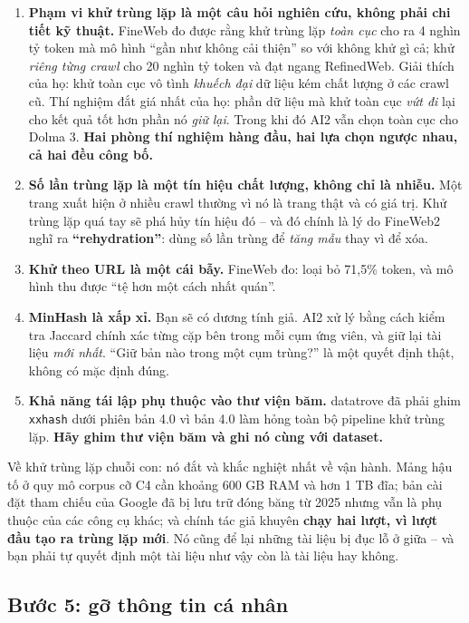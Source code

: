 \begin{enumerate}
	\item \textbf{Phạm vi khử trùng lặp là một câu hỏi nghiên cứu, không phải chi tiết kỹ thuật.} FineWeb đo được rằng khử trùng lặp \emph{toàn cục} cho ra 4 nghìn tỷ token mà mô hình “gần như không cải thiện” so với không khử gì cả; khử \emph{riêng từng crawl} cho 20 nghìn tỷ token và đạt ngang RefinedWeb. Giải thích của họ: khử toàn cục vô tình \emph{khuếch đại} dữ liệu kém chất lượng ở các crawl cũ. Thí nghiệm đắt giá nhất của họ: phần dữ liệu mà khử toàn cục \emph{vứt đi} lại cho kết quả tốt hơn phần nó \emph{giữ lại}. Trong khi đó AI2 vẫn chọn toàn cục cho Dolma 3. \textbf{Hai phòng thí nghiệm hàng đầu, hai lựa chọn ngược nhau, cả hai đều công bố.}
	\item \textbf{Số lần trùng lặp là một tín hiệu chất lượng, không chỉ là nhiễu.} Một trang xuất hiện ở nhiều crawl thường vì nó là trang thật và có giá trị. Khử trùng lặp quá tay sẽ phá hủy tín hiệu đó -- và đó chính là lý do FineWeb2 nghĩ ra \textbf{“rehydration”}: dùng số lần trùng để \emph{tăng mẫu} thay vì để xóa.
	\item \textbf{Khử theo URL là một cái bẫy.} FineWeb đo: loại bỏ 71{,}5\% token, và mô hình thu được “tệ hơn một cách nhất quán”.
	\item \textbf{MinHash là xấp xỉ.} Bạn sẽ có dương tính giả. AI2 xử lý bằng cách kiểm tra Jaccard chính xác từng cặp bên trong mỗi cụm ứng viên, và giữ lại tài liệu \emph{mới nhất}. “Giữ bản nào trong một cụm trùng?” là một quyết định thật, không có mặc định đúng.
	\item \textbf{Khả năng tái lập phụ thuộc vào thư viện băm.} datatrove đã phải ghim \texttt{xxhash} dưới phiên bản 4.0 vì bản 4.0 làm hỏng toàn bộ pipeline khử trùng lặp. \textbf{Hãy ghim thư viện băm và ghi nó cùng với dataset.}
\end{enumerate}

\noindent Về khử trùng lặp chuỗi con: nó đắt và khắc nghiệt nhất về vận hành. Mảng hậu tố ở quy mô corpus cỡ C4 cần khoảng 600 GB RAM và hơn 1 TB đĩa; bản cài đặt tham chiếu của Google đã bị lưu trữ đóng băng từ 2025 nhưng vẫn là phụ thuộc của các công cụ khác; và chính tác giả khuyên \textbf{chạy hai lượt, vì lượt đầu tạo ra trùng lặp mới}. Nó cũng để lại những tài liệu bị đục lỗ ở giữa -- và bạn phải tự quyết định một tài liệu như vậy còn là tài liệu hay không.

\subsection{Bước 5: gỡ thông tin cá nhân}
\label{ssec:pii}

